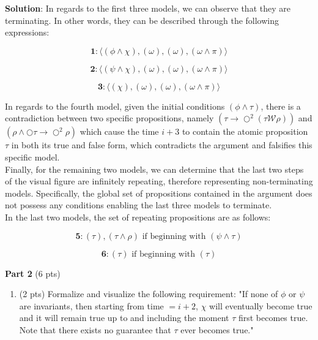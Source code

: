 \documentclass[12pt]{article}
\begin{document}
\begin{spacing}{1.5}
\begin{enumerate}
		      \textbf{Solution}: In regards to the first three models, we can observe that they are terminating. In other words, they can be described through the following expressions:
		      		      		      		      		      
		      $$\textbf{1}: \langle (\phi \land \chi), (\omega), (\omega), (\omega \land \pi) \rangle$$
		      		      		      		      		      
		      $$\textbf{2}: \langle (\psi \land \chi), (\omega),(\omega),(\omega \land \pi) \rangle$$
		      		      		      		      		      
		      $$\textbf{3}: \langle (\chi), (\omega),(\omega),(\omega \land \pi) \rangle $$
		      		      		      		      		      
		      In regards to the fourth model, given the initial conditions $(\phi \land \tau)$, there is a contradiction between two specific propositions, namely $(\tau \rightarrow \bigcirc^2(\tau \mathcal{W} \rho))$ and $(\rho \land \bigcirc \tau \rightarrow \bigcirc^2 \rho)$ which cause the time $i+3$ to contain the atomic proposition $\tau$ in both its true and false form, which contradicts the argument and falsifies this specific model.\\
		      		      		      		      		                      
		      Finally, for the remaining two models, we can determine that the last two steps of the visual figure are infinitely repeating, therefore representing non-terminating models. Specifically, the global set of propositions contained in the argument does not possess any conditions enabling the last three models to terminate.\\
		      		      		      		      		      
		      In the last two models, the set of repeating propositions are as follows:
		      		      		      		      		      
		      $$\textbf{5}: (\tau), (\tau \land \rho) \text{ if beginning with } (\psi \land \tau)$$
		      		      		      		      		      
		      $$\textbf{6}: (\tau) \text{ if beginning with } (\tau)$$
		      		      		      		      		      		              
	\end{enumerate}
					
	\textbf{Part 2} (6 pts)
					
	\begin{enumerate}
		\item (2 pts) Formalize and visualize the following requirement: "If none of $\phi$ or $\psi$ are invariants, then starting from time $=i+2$, $\chi$ will eventually become true and it will remain true up to and including the moment $\tau$ first becomes true. Note that there exists no guarantee that $\tau$ ever becomes true."\\
		      		      		      		      		      

\end{enumerate}
\end{spacing}
\end{document}
